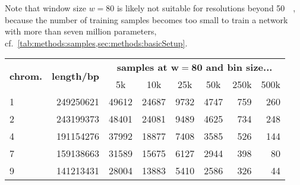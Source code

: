 Note that window size $w=80$ is likely not suitable for resolutions beyond \SI{50}{\kilo\bp}, because the number of training samples becomes too small
to train a network with more than seven million parameters, cf.~\cref{tab:methods:samples,sec:methods:basicSetup}.
\begin{table}[hbp]
\centering
\begin{tabular}{lrrrrrrr}
\hline
\multicolumn{1}{c}{\multirow{2}{*}{\textbf{chrom.}}} & \multicolumn{1}{c}{\multirow{2}{*}{\textbf{length/bp}}} & \multicolumn{6}{c}{\textbf{samples at $\mathbf{w=80}$ and bin size...}}                                                                                                \\
\multicolumn{1}{c}{}                                     & \multicolumn{1}{c}{}                                    & \multicolumn{1}{c}{5k} & \multicolumn{1}{c}{10k} & \multicolumn{1}{c}{25k} & \multicolumn{1}{c}{50k} & \multicolumn{1}{c}{250k} & \multicolumn{1}{c}{500k} \\ \hline
1                                                        & 249250621                                               & 49612                  & 24687                   & 9732                    & 4747                    & 759                      & 260                      \\
2                                                        & 243199373                                               & 48401                  & 24081                   & 9489                    & 4625                    & 734                      & 248                      \\
4                                                        & 191154276                                               & 37992                  & 18877                   & 7408                    & 3585                    & 526                      & 144                      \\
7                                                        & 159138663                                               & 31589                  & 15675                   & 6127                    & 2944                    & 398                      & 80                       \\
9                                                        & 141213431                                               & 28004                  & 13883                   & 5410                    & 2586                    & 326                      & 44                       \\

\end{tabular}
\end{table}
